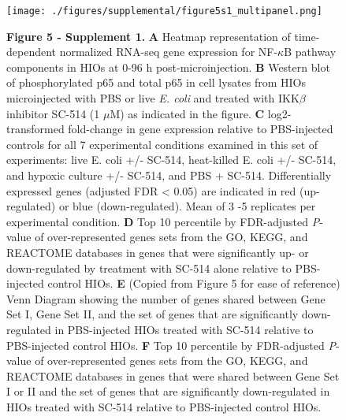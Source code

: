 \documentclass[9pt,lineo]{elife}
\date{\today}
\title{}
\begin{document}
\begin{figure}
\begin{fullwidth}
\centering\texttt{[image: ./figures/supplemental/figure5s1\_multipanel.png]}
 \caption*{\textbf{Figure 5 - Supplement 1. } \textbf{A} Heatmap representation of time-dependent normalized RNA-seq gene expression for NF-$\kappa$B pathway components in HIOs at 0-96 h post-microinjection. \textbf{B} Western blot of phosphorylated p65 and total p65 in cell lysates from HIOs microinjected with PBS or live \textit{E. coli} and treated with IKK$\beta$ inhibitor SC-514 (1 $\mu$M) as indicated in the figure. \textbf{C} log2-transformed fold-change in gene expression relative to PBS-injected controls for all 7 experimental conditions examined in this set of experiments: live E. coli +/- SC-514, heat-killed E. coli +/- SC-514, and hypoxic culture +/- SC-514, and PBS + SC-514. Differentially expressed genes (adjusted FDR < 0.05) are indicated in red (up-regulated) or blue (down-regulated). Mean of 3 -5 replicates per experimental condition. \textbf{D} Top 10 percentile by FDR-adjusted \textit{P}-value of over-represented genes sets from the GO, KEGG, and REACTOME databases in genes that were significantly up- or down-regulated by treatment with SC-514 alone relative to PBS-injected control HIOs. \textbf{E} (Copied from Figure 5 for ease of reference) Venn Diagram showing the number of genes shared between Gene Set I, Gene Set II, and the set of genes that are significantly down-regulated in PBS-injected HIOs treated with SC-514 relative to PBS-injected control HIOs. \textbf{F} Top 10 percentile by FDR-adjusted \textit{P}-value of  over-represented genes sets from the GO, KEGG, and REACTOME databases in genes that were shared between Gene Set I or II and the set of genes that are significantly down-regulated in HIOs treated with SC-514 relative to PBS-injected control HIOs.}
\label{fig:fullwidth}
\end{fullwidth}
\end{figure}
\end{document}
